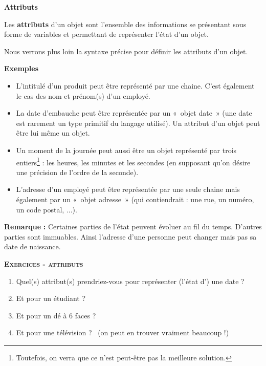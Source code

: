 \bigskip

{\sffamily\bfseries\upshape
Attributs}

{
Les \textbf{attributs} d'un objet sont
l'ensemble des informations se présentant sous forme
de variables et permettant de représenter l'état
d'un objet.}

{
Nous verrons plus loin la syntaxe précise pour définir les attributs
d'un objet.}

{
\textbf{Exemples} }

\liststyleListv
\begin{itemize}
\item {
L'intitulé d'un produit peut être
représenté par une chaine. C'est également le cas des
nom et prénom(s) d'un employé.}
\item {
La date d'embauche peut être représentée par un «~objet
date~» (une date est rarement un type primitif du langage utilisé). Un
attribut d'un objet peut être lui même un objet.}
\item {
Un moment de la journée peut aussi être un objet représenté par trois
entiers\footnote{Toutefois, on verra que ce n'est
peut-être pas la meilleure solution.} : les heures, les minutes et les
secondes (en supposant qu'on désire une précision de
l'ordre de la seconde).}
\item {
L'adresse d'un employé peut être
représentée par une seule chaine mais également par un «~objet
adresse~» (qui contiendrait : une rue, un numéro, un code postal,
...).}
\end{itemize}

{
\textbf{Remarque}\textbf{ : }Certaines parties de
l'état peuvent évoluer au fil du temps.
D'autres parties sont immuables. Ainsi
l'adresse d'une personne peut changer
mais pas sa date de naissance. }

{\sffamily\bfseries\scshape
Exercices - attributs}

\liststyleWWviiiNumi
\begin{enumerate}
\item {
Quel(s) attribut(s) prendriez-vous pour représenter
(l'état d') une date ?}
\item {
Et pour un étudiant ?}
\item {
Et pour un dé à 6 faces ?}
\item {
Et pour une télévision ? \ (on peut en trouver vraiment beaucoup !)}
\end{enumerate}

\bigskip

